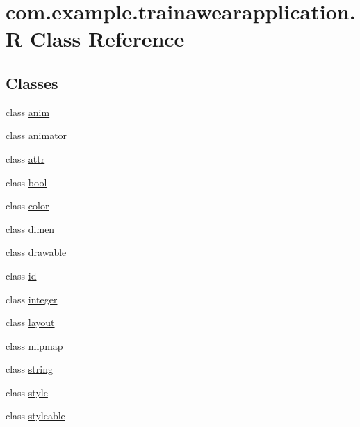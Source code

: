 \hypertarget{classcom_1_1example_1_1trainawearapplication_1_1_r}{}\section{com.\+example.\+trainawearapplication.\+R Class Reference}
\label{classcom_1_1example_1_1trainawearapplication_1_1_r}
\subsection*{Classes}
\begin{DoxyCompactItemize}
\item 
class \mbox{\hyperlink{classcom_1_1example_1_1trainawearapplication_1_1_r_1_1anim}{anim}}
\item 
class \mbox{\hyperlink{classcom_1_1example_1_1trainawearapplication_1_1_r_1_1animator}{animator}}
\item 
class \mbox{\hyperlink{classcom_1_1example_1_1trainawearapplication_1_1_r_1_1attr}{attr}}
\item 
class \mbox{\hyperlink{classcom_1_1example_1_1trainawearapplication_1_1_r_1_1bool}{bool}}
\item 
class \mbox{\hyperlink{classcom_1_1example_1_1trainawearapplication_1_1_r_1_1color}{color}}
\item 
class \mbox{\hyperlink{classcom_1_1example_1_1trainawearapplication_1_1_r_1_1dimen}{dimen}}
\item 
class \mbox{\hyperlink{classcom_1_1example_1_1trainawearapplication_1_1_r_1_1drawable}{drawable}}
\item 
class \mbox{\hyperlink{classcom_1_1example_1_1trainawearapplication_1_1_r_1_1id}{id}}
\item 
class \mbox{\hyperlink{classcom_1_1example_1_1trainawearapplication_1_1_r_1_1integer}{integer}}
\item 
class \mbox{\hyperlink{classcom_1_1example_1_1trainawearapplication_1_1_r_1_1layout}{layout}}
\item 
class \mbox{\hyperlink{classcom_1_1example_1_1trainawearapplication_1_1_r_1_1mipmap}{mipmap}}
\item 
class \mbox{\hyperlink{classcom_1_1example_1_1trainawearapplication_1_1_r_1_1string}{string}}
\item 
class \mbox{\hyperlink{classcom_1_1example_1_1trainawearapplication_1_1_r_1_1style}{style}}
\item 
class \mbox{\hyperlink{classcom_1_1example_1_1trainawearapplication_1_1_r_1_1styleable}{styleable}}
\end{DoxyCompactItemize}


